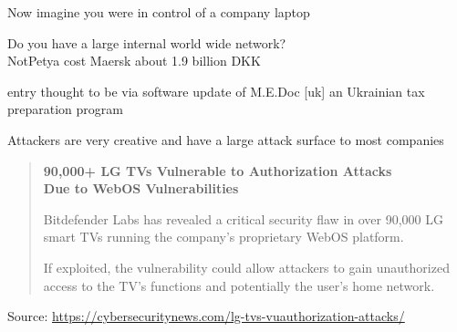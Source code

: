 \documentclass[Screen16to9,17pt]{foils}
\begin{document}


\begin{list2}
\item Now imagine you were in control of a company laptop
\item Do you have a large internal world wide network?\\
NotPetya cost Maersk about 1.9 billion DKK

\item entry thought to be via software update of M.E.Doc [uk] an Ukrainian tax preparation program
\item Attackers are very creative and have a large attack surface to most companies
\end{list2}




\begin{quote}{\large\bf
90,000+ LG TVs Vulnerable to Authorization Attacks\\
Due to WebOS Vulnerabilities}

Bitdefender Labs has revealed a critical security flaw in over 90,000 LG smart TVs running the company’s proprietary WebOS platform.

If exploited, the vulnerability could allow attackers to gain unauthorized access to the TV’s functions and potentially the user’s home network.

\end{quote}
Source: \url{https://cybersecuritynews.com/lg-tvs-vuauthorization-attacks/}



\end{document}
